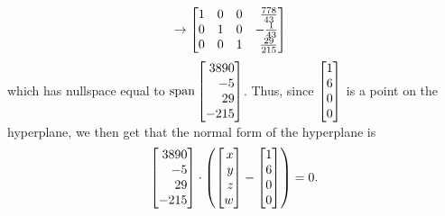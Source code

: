 \begin{exercises}
\begin{problist}
\begin{solution}
\begin{enumerate}
\begin{align*}
							&\rightarrow \mat{1&0&0&\frac{778}{43}\\0&1&0&-\frac{1}{43}\\0&0&1&\frac{29}{215}}
						\end{align*}
						which has nullspace equal to $\Span{\mat{3890\\-5\\29\\-215}}$. Thus, since $\mat{1\\6\\0\\0}$ is a point on the hyperplane, 
						we then get that the normal form of the hyperplane is \[\mat{3890\\-5\\29\\-215}\cdot\left(\mat{x\\y\\z\\w}-\mat{1\\6\\0\\0} \right)=0.\]
				\end{enumerate}
			\end{solution}	


\end{problist}
\end{exercises}
